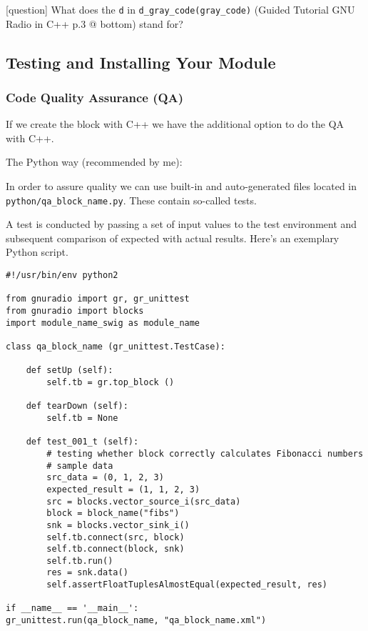 \documentclass{article}
\begin{document}
\color{black}

\bigskip

\color{blue}
[question] What does the \texttt{d} in \verb|d_gray_code(gray_code)| (Guided Tutorial GNU Radio in C++ p.3 @ bottom) stand for?
\color{black}

\subsection{Testing and Installing Your Module}

\subsubsection{Code Quality Assurance (QA)}

If we create the block with C++ we have the additional option to do the QA with C++. 

\bigskip

The Python way (recommended by me):

\medskip

In order to assure quality we can use built-in and auto-generated files located in \verb|python/qa_block_name.py|. These contain so-called tests.

\medskip

A test is conducted by passing a set of input values to the test environment and subsequent comparison of expected with actual results. Here's an exemplary Python script.

\begin{verbatim}
#!/usr/bin/env python2

from gnuradio import gr, gr_unittest
from gnuradio import blocks
import module_name_swig as module_name

class qa_block_name (gr_unittest.TestCase):

	def setUp (self):
		self.tb = gr.top_block ()
	
	def tearDown (self):
		self.tb = None
	
	def test_001_t (self):
		# testing whether block correctly calculates Fibonacci numbers
		# sample data 
		src_data = (0, 1, 2, 3)
		expected_result = (1, 1, 2, 3)
		src = blocks.vector_source_i(src_data)
		block = block_name("fibs")
		snk = blocks.vector_sink_i()
		self.tb.connect(src, block)
		self.tb.connect(block, snk)
		self.tb.run()
		res = snk.data()
		self.assertFloatTuplesAlmostEqual(expected_result, res)

if __name__ == '__main__':
gr_unittest.run(qa_block_name, "qa_block_name.xml")

\end{verbatim}
\end{document}
